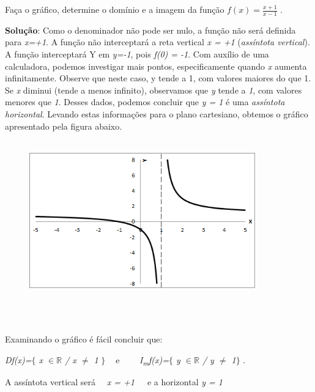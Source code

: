 \begin{texemplo}
Faça o gráfico, determine o domínio e a imagem da função  \( f \left( x \right) =\frac{x+1}{x-1} \) .

\textbf{Solução}: Como o denominador não pode ser nulo, a função não será definida para \textit{x=+1}. A função não interceptará a reta vertical \textit{x = +1 }(\textit{assíntota vertical})\textit{. }A função interceptará Y em \textit{y=-1}, pois \textit{f(0) = -1}. Com auxílio de uma calculadora, podemos investigar mais pontos, especificamente quando \textit{x} aumenta infinitamente. Observe que neste caso, y tende a 1, com valores maiores do que 1. Se \textit{x} diminui (tende a menos infinito), observamos que \textit{y} tende a \textit{1}, com valores menores que \textit{1}. Desses dados, podemos concluir que \textit{y = 1} é uma \textit{assíntota horizontal}. Levando estas informações para o plano cartesiano, obtemos o gráfico apresentado pela figura abaixo.

\begin{figure}[H]
	\begin{Center}
		\includegraphics[width=3.86in,height=2.74in]{capitulos/outras_funcoes/media/image13.png}
	\end{Center}
\end{figure}

~~

\quad Examinando o gráfico é fácil concluir que: 

\quad \textit{Df(x)=$ \{ $  x $ \in \mathbb{R} $  \textbf{ }/ x $ \neq $  1} \textit{$ \} $ ~ } e~~~~ \textit{I\textsubscript{m}f(x)=$ \{ $ y $ \in \mathbb{R} $   / y $ \neq $  1$ \} $ }. 

\quad A assíntota vertical será~~ \textit{x = +1}~~~e a horizontal  \textit{y = 1} \textit{  }\qedsymbol{} 
\end{texemplo}

